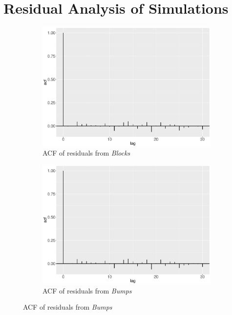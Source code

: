 \section{Residual Analysis of Simulations}
\begin{figure}[!ht]
    \centering
    \begin{subfigure}{0.45\textwidth}
    \centering
    \includegraphics[width=\textwidth]{Chapters/02TractorSplineTheory/plot/ggplot/ggacfBlocks7.pdf}
    \caption{ACF of residuals from \textit{Blocks}}
    \end{subfigure}%
    \begin{subfigure}{0.45\textwidth}
    \centering
    \includegraphics[width=\textwidth]{Chapters/02TractorSplineTheory/plot/ggplot/ggacfBumps7.pdf}
    \caption{ACF of residuals from \textit{Bumps}}
    \end{subfigure}

\end{figure}
